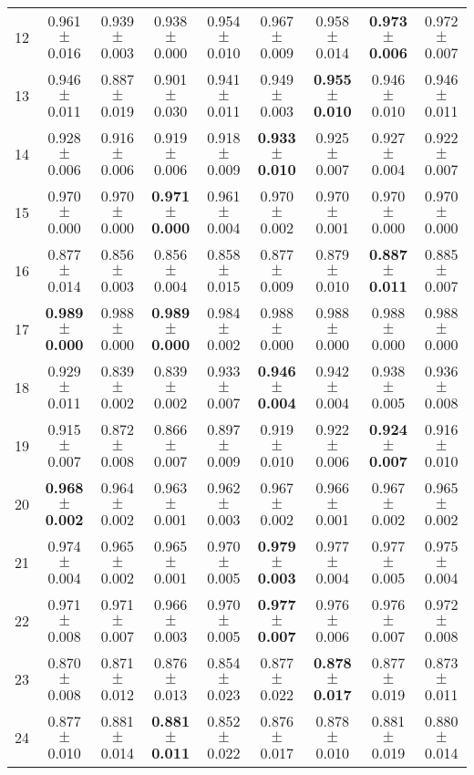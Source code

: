 \begin{table}[!ht]
{\begin{tabular}{r c c c c c c c c}
12 & 0.961 $\pm$ 0.016 & 0.939 $\pm$ 0.003 & 0.938 $\pm$ 0.000 & 0.954 $\pm$ 0.010 & 0.967 $\pm$ 0.009 & 0.958 $\pm$ 0.014 & \textbf{0.973 $\pm$ 0.006} & 0.972 $\pm$ 0.007 \\
13 & 0.946 $\pm$ 0.011 & 0.887 $\pm$ 0.019 & 0.901 $\pm$ 0.030 & 0.941 $\pm$ 0.011 & 0.949 $\pm$ 0.003 & \textbf{0.955 $\pm$ 0.010} & 0.946 $\pm$ 0.010 & 0.946 $\pm$ 0.011 \\
14 & 0.928 $\pm$ 0.006 & 0.916 $\pm$ 0.006 & 0.919 $\pm$ 0.006 & 0.918 $\pm$ 0.009 & \textbf{0.933 $\pm$ 0.010} & 0.925 $\pm$ 0.007 & 0.927 $\pm$ 0.004 & 0.922 $\pm$ 0.007 \\
15 & 0.970 $\pm$ 0.000 & 0.970 $\pm$ 0.000 & \textbf{0.971 $\pm$ 0.000} & 0.961 $\pm$ 0.004 & 0.970 $\pm$ 0.002 & 0.970 $\pm$ 0.001 & 0.970 $\pm$ 0.000 & 0.970 $\pm$ 0.000 \\
16 & 0.877 $\pm$ 0.014 & 0.856 $\pm$ 0.003 & 0.856 $\pm$ 0.004 & 0.858 $\pm$ 0.015 & 0.877 $\pm$ 0.009 & 0.879 $\pm$ 0.010 & \textbf{0.887 $\pm$ 0.011} & 0.885 $\pm$ 0.007 \\
17 & \textbf{0.989 $\pm$ 0.000} & 0.988 $\pm$ 0.000 & \textbf{0.989 $\pm$ 0.000} & 0.984 $\pm$ 0.002 & 0.988 $\pm$ 0.000 & 0.988 $\pm$ 0.000 & 0.988 $\pm$ 0.000 & 0.988 $\pm$ 0.000 \\
18 & 0.929 $\pm$ 0.011 & 0.839 $\pm$ 0.002 & 0.839 $\pm$ 0.002 & 0.933 $\pm$ 0.007 & \textbf{0.946 $\pm$ 0.004} & 0.942 $\pm$ 0.004 & 0.938 $\pm$ 0.005 & 0.936 $\pm$ 0.008 \\
19 & 0.915 $\pm$ 0.007 & 0.872 $\pm$ 0.008 & 0.866 $\pm$ 0.007 & 0.897 $\pm$ 0.009 & 0.919 $\pm$ 0.010 & 0.922 $\pm$ 0.006 & \textbf{0.924 $\pm$ 0.007} & 0.916 $\pm$ 0.010 \\
20 & \textbf{0.968 $\pm$ 0.002} & 0.964 $\pm$ 0.002 & 0.963 $\pm$ 0.001 & 0.962 $\pm$ 0.003 & 0.967 $\pm$ 0.002 & 0.966 $\pm$ 0.001 & 0.967 $\pm$ 0.002 & 0.965 $\pm$ 0.002 \\
21 & 0.974 $\pm$ 0.004 & 0.965 $\pm$ 0.002 & 0.965 $\pm$ 0.001 & 0.970 $\pm$ 0.005 & \textbf{0.979 $\pm$ 0.003} & 0.977 $\pm$ 0.004 & 0.977 $\pm$ 0.005 & 0.975 $\pm$ 0.004 \\
22 & 0.971 $\pm$ 0.008 & 0.971 $\pm$ 0.007 & 0.966 $\pm$ 0.003 & 0.970 $\pm$ 0.005 & \textbf{0.977 $\pm$ 0.007} & 0.976 $\pm$ 0.006 & 0.976 $\pm$ 0.007 & 0.972 $\pm$ 0.008 \\
23 & 0.870 $\pm$ 0.008 & 0.871 $\pm$ 0.012 & 0.876 $\pm$ 0.013 & 0.854 $\pm$ 0.023 & 0.877 $\pm$ 0.022 & \textbf{0.878 $\pm$ 0.017} & 0.877 $\pm$ 0.019 & 0.873 $\pm$ 0.011 \\
24 & 0.877 $\pm$ 0.010 & 0.881 $\pm$ 0.014 & \textbf{0.881 $\pm$ 0.011} & 0.852 $\pm$ 0.022 & 0.876 $\pm$ 0.017 & 0.878 $\pm$ 0.010 & 0.881 $\pm$ 0.019 & 0.880 $\pm$ 0.014 \\

\end{tabular}}
\end{table}
